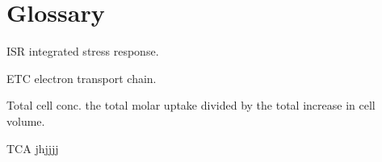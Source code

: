 \chapter*{Glossary}      %
\thispagestyle{plain}
%
\begin{glossary}
\item[ISR] integrated stress response.
\item[ETC] electron transport chain.
\item[Total cell conc.] the total molar uptake divided by the total increase in cell volume.
\item[TCA] jhjjjj
 
\end{glossary}